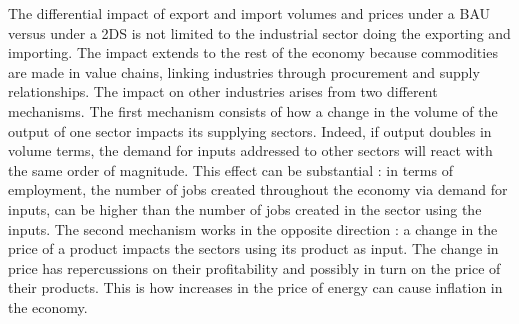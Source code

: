 \documentclass[12pt,english]{article}
\begin{document}
The differential impact of export and import volumes and prices under a BAU versus under a 2DS is not limited to the industrial sector doing the exporting and importing. The impact extends to the rest of the economy because commodities are made in value chains, linking industries through procurement and supply relationships. The impact on other industries arises from two different mechanisms. The first mechanism consists of how a change in the volume of the output of one sector impacts its supplying sectors. Indeed, if output doubles in volume terms, the demand for inputs addressed to other sectors will react with the same order of magnitude. This effect can be substantial : in terms of employment, the number of jobs created throughout the economy via demand for inputs, can be higher than the number of jobs created in the sector using the inputs. The second mechanism works in the opposite direction : a change in the price of a product impacts the sectors using its product as input. The change in price has repercussions on their profitability and possibly in turn on the price of their products. This is how increases in the price of energy can cause inflation in the economy.

\end{document}
